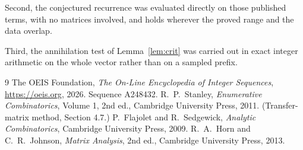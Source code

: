 \documentclass[11pt,a4paper]{article}
\theoremstyle{plain}
\theoremstyle{definition}
\begin{document}
Second, the conjectured recurrence was evaluated directly on those published terms, with no
matrices involved, and holds wherever the proved range and the data overlap.

Third, the annihilation test of Lemma~\ref{lem:crit} was carried out in exact integer
arithmetic on the whole vector rather than on a sampled prefix.

\begin{thebibliography}{9}
 The OEIS Foundation, \emph{The On-Line Encyclopedia of Integer
Sequences}, \url{https://oeis.org}, 2026. Sequence A248432.
 R.~P.~Stanley, \emph{Enumerative Combinatorics}, Volume 1, 2nd ed.,
Cambridge University Press, 2011. (Transfer-matrix method, Section 4.7.)
 P.~Flajolet and R.~Sedgewick, \emph{Analytic Combinatorics}, Cambridge
University Press, 2009.
 R.~A.~Horn and C.~R.~Johnson, \emph{Matrix Analysis}, 2nd ed., Cambridge
University Press, 2013.
\end{thebibliography}
\end{document}
